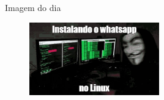 \documentclass{beamer}
\begin{document}
            
            

\begin{frame}[fragile]{Imagem do dia}

        \begin{figure}[H]
            \centerline{\includegraphics[width=0.5\textwidth]{assets/imagem-do-dia/terminal-hascker.jpg}}
            
        \end{figure}
\end{frame}


\footlinecolor{}

\backmatter
\end{document}
